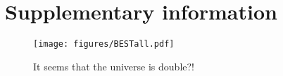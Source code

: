 \chapter{Supplementary information}
\label{chap:supp}

\begin{figure}
    \centering
        \texttt{[image: figures/BESTall.pdf]}
   \caption{It seems that the universe is double?!}
    \label{Supp. Fig:2}
\end{figure}

